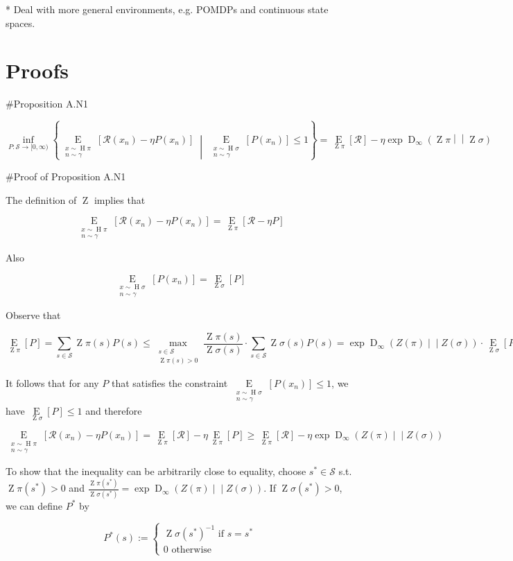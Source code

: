 \documentclass[a4paper]{article}
\newcommand{\AP}[1]{\left(#1\right)}
\newcommand{\AB}[1]{\left[#1\right]}
\newcommand{\ACM}[2]{\left\{#1\;\middle\vert\;#2\right\}}
\newcommand{\Ea}[2]{\underset{#1}{\operatorname{E}}\AB{#2}}
\newcommand{\RD}[3]{\operatorname{D}_{#1}\AP{#2\middle\vert\middle\vert#3}}
\newcommand{\St}{\mathcal{S}}
\newcommand{\R}{\mathcal{R}}
\newcommand{\Pe}{P}
\DeclareMathOperator{\Hi}{H}
\DeclareMathOperator{\Z}{Z}
\begin{document}
* Deal with more general environments, e.g. POMDPs and continuous state spaces.

\section{Proofs}

\#Proposition A.N1

$$\inf_{\Pe:\St\rightarrow[0,\infty)}\ACM{\Ea{\substack{x\sim\Hi{\pi}\\n\sim\gamma}}{\R\AP{x_n}-\eta\Pe\AP{x_n}}}{\Ea{\substack{x\sim\Hi{\sigma}\\n\sim\gamma}}{\Pe\AP{x_n}}\leq1}=\Ea{\Z{\pi}}{\R}-\eta \exp{\RD{\infty}{\Z{\pi}}{\Z{\sigma}}}$$

\#Proof of Proposition A.N1

The definition of $\Z$ implies that

$$\Ea{\substack{x\sim\Hi{\pi}\\n\sim\gamma}}{\R\AP{x_n}-\eta\Pe\AP{x_n}}=\Ea{\Z{\pi}}{\R-\eta P}$$

Also

$$\Ea{\substack{x\sim\Hi{\sigma}\\n\sim\gamma}}{\Pe\AP{x_n}}=\Ea{\Z{\sigma}}{P}$$

Observe that

$$\Ea{\Z{\pi}}{P} = \sum_{s\in\St}\Z{\pi}(s)P(s) \leq \max_{\substack{s \in \St \\ \Z{\pi}(s) > 0}}\frac{\Z{\pi}(s)}{\Z{\sigma}(s)}\cdot\sum_{s\in\St}\Z{\sigma}(s)P(s) = \exp{\RD{\infty}{Z(\pi)}{Z(\sigma)}} \cdot \Ea{\Z{\sigma}}{P}$$

It follows that for any $P$ that satisfies the constraint $\Ea{\substack{x\sim\Hi{\sigma}\\n\sim\gamma}}{\Pe\AP{x_n}} \leq 1$, we have $\Ea{\Z{\sigma}}{\Pe} \leq 1$ and therefore

$$\Ea{\substack{x\sim\Hi{\pi}\\n\sim\gamma}}{\R\AP{x_n}-\eta\Pe\AP{x_n}} = \Ea{\Z{\pi}}{\R} - \eta \Ea{\Z{\pi}}{\Pe} \geq \Ea{\Z{\pi}}{\R} - \eta\exp{\RD{\infty}{Z(\pi)}{Z(\sigma)}}$$

To show that the inequality can be arbitrarily close to equality, choose $s^* \in \St$ s.t. $\Z{\pi}(s^*) > 0$ and $\frac{\Z{\pi}\AP{s^*}}{\Z{\sigma}\AP{s^*}} = \exp{\RD{\infty}{Z(\pi)}{Z(\sigma)}}$. If $\Z{\sigma}\AP{s^*} > 0$, we can define $\Pe^*$ by

$$\Pe^*(s):=\begin{cases} \Z{\sigma}(s^*)^{-1} \text{ if } s=s^* \\ 0 \text{ otherwise} \end{cases}$$
\end{document}
